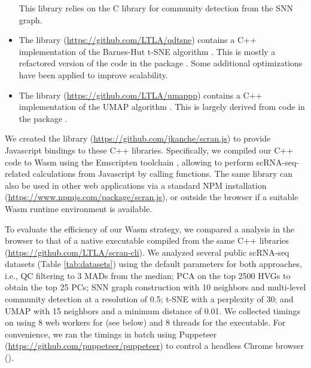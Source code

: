 \documentclass{article}
\begin{document}
\begin{itemize}
This library relies on the  C library \cite{csardi2006igraph} for community detection from the SNN graph.
\item The  library (\url{https://github.com/LTLA/qdtsne}) contains a C++ implementation of the Barnes-Hut t-SNE algorithm \cite{maaten2014accelerating}.
This is mostly a refactored version of the code in the  package \cite{rtsne}.
Some additional optimizations have been applied to improve scalability.
\item The  library (\url{https://github.com/LTLA/umappp}) contains a C++ implementation of the UMAP algorithm \cite{mcinnes2018umap}.
This is largely derived from code in the  package \cite{uwot}.
\end{itemize}

We created the  library (\url{https://github.com/jkanche/scran.js}) to provide Javascript bindings to these C++ libraries.
Specifically, we compiled our C++ code to Wasm using the Emscripten toolchain \cite{zakai2011emscripten},
allowing  to perform scRNA-seq-related calculations from Javascript by calling  functions.
The same library can also be used in other web applications via a standard NPM installation (\url{https://www.npmjs.com/package/scran.js}),
or outside the browser if a suitable Wasm runtime environment is available.

To evaluate the efficiency of our Wasm strategy, 
we compared a  analysis in the browser to that of a native executable compiled from the same C++ libraries (\url{https://github.com/LTLA/scran-cli}).
We analyzed several public scRNA-seq datasets (Table \ref{tab:datasets}) using the default  parameters for both approaches, i.e.,
QC filtering to 3 MADs from the median;
PCA on the top 2500 HVGs to obtain the top 25 PCs;
SNN graph construction with 10 neighbors and multi-level community detection at a resolution of 0.5;
t-SNE with a perplexity of 30;
and UMAP with 15 neighbors and a minimum distance of 0.01.
We collected timings on  using 8 web workers for  (see below) and 8 threads for the executable.
For convenience, we ran the  timings in batch using Puppeteer (\url{https://github.com/puppeteer/puppeteer}) to control a headless Chrome browser ().
\end{document}
